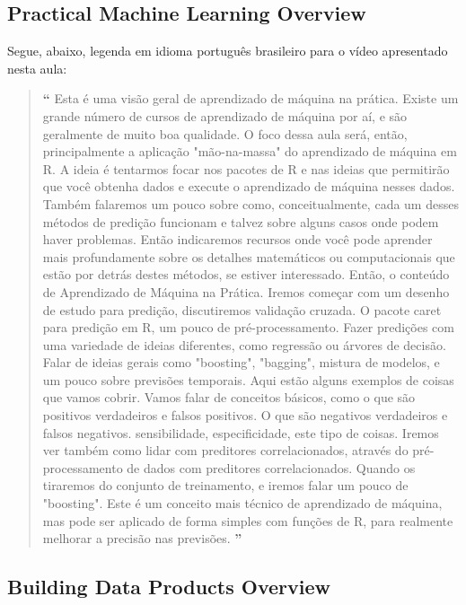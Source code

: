 \subsection{Practical Machine Learning Overview}

Segue, abaixo, legenda em idioma português brasileiro para o vídeo apresentado nesta aula:

\begin{quotation}%
\begin{small}
{\large\textbf{``}}%
Esta é uma visão geral de aprendizado de máquina na prática. Existe um grande número de cursos de aprendizado de máquina por aí, e são geralmente de muito boa qualidade. O foco dessa aula será, então, principalmente a aplicação "mão-na-massa" do aprendizado de máquina em R. A ideia é tentarmos focar nos pacotes de R e nas ideias que permitirão que você obtenha dados e execute o aprendizado de máquina nesses dados. Também falaremos um pouco sobre como, conceitualmente, cada um desses métodos de predição funcionam e talvez sobre alguns casos onde podem haver problemas. Então indicaremos recursos onde você pode aprender mais profundamente  sobre os detalhes matemáticos ou computacionais que estão por detrás destes métodos, se estiver interessado. Então, o conteúdo de Aprendizado de Máquina na Prática. Iremos começar com um desenho de estudo para predição, discutiremos validação cruzada. O pacote caret para predição em R, um pouco de pré-processamento. Fazer predições com uma variedade de ideias diferentes, como regressão ou árvores de decisão. Falar de ideias gerais como "boosting", "bagging", mistura de modelos, e um pouco sobre previsões temporais. Aqui estão alguns exemplos de coisas que vamos cobrir. Vamos falar de conceitos básicos, como o que são positivos verdadeiros e falsos positivos. O que são negativos verdadeiros e falsos negativos. sensibilidade, especificidade, este tipo de coisas. Iremos ver também como lidar com preditores correlacionados, através do pré-processamento de dados com preditores correlacionados. Quando os tiraremos do conjunto de treinamento, e iremos falar um pouco de "boosting". Este é um conceito mais técnico de aprendizado de máquina, mas pode ser aplicado de forma simples com funções de R, para realmente melhorar a precisão nas previsões.
{\large\textbf{''}}
\end{small}
\end{quotation}


\subsection{Building Data Products Overview}


